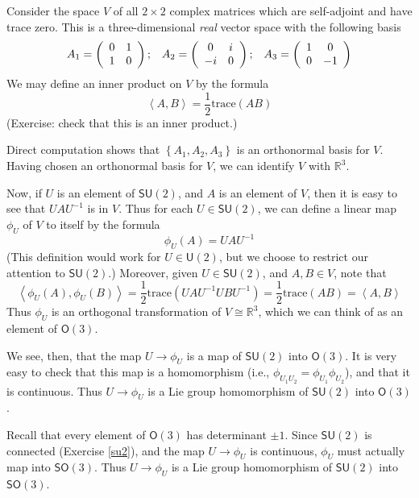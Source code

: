 \documentclass[12pt]{amsbook}
\theoremstyle{plain}
\numberwithin{equation}{chapter}
\numberwithin{theorem}{chapter}
\begin{document}
Consider the space $V$ of all $2\times2$ complex matrices which are
self-adjoint and have trace zero. This is a three-dimensional \textit{real}
vector space with the following basis
\[%
\begin{array}
[c]{ccc}%
A_{1}=\left(
\begin{array}
[c]{cc}%
0 & 1\\
1 & 0
\end{array}
\right)  ; & A_{2}=\left(
\begin{array}
[c]{cc}%
0 & i\\
-i & 0
\end{array}
\right)  ; & A_{3}=\left(
\begin{array}
[c]{cc}%
1 & 0\\
0 & -1
\end{array}
\right)
\end{array}
\]
We may define an inner product on $V$ by the formula
\[
\left\langle A,B\right\rangle =\frac12\mathrm{trace}(AB)
\]
(Exercise: check that this is an inner product.)

Direct computation shows that $\left\{  A_{1},A_{2},A_{3}\right\}  $ is an
orthonormal basis for $V$. Having chosen an orthonormal basis for $V$, we can
identify $V$ with $\mathbb{R}^{3}$.

Now, if $U$ is an element of $\mathsf{SU}(2)$, and $A$ is an element of $V$,
then it is easy to see that $UAU^{-1}$ is in $V$. Thus for each $U\in
\mathsf{SU}(2)$, we can define a linear map $\phi_{U}$ of $V$ to itself by the
formula
\[
\phi_{U}(A)=UAU^{-1}%
\]
(This definition would work for $U\in\mathsf{U}(2)$, but we choose to restrict
our attention to $\mathsf{SU}(2)$.) Moreover, given $U\in\mathsf{SU}(2)$, and
$A,B\in V$, note that
\[
\left\langle \phi_{U}(A),\phi_{U}(B)\right\rangle =\frac12\mathrm{trace}%
(UAU^{-1}UBU^{-1})=\frac12\mathrm{trace}(AB)=\left\langle A,B\right\rangle
\]
Thus $\phi_{U}$ is an orthogonal transformation of $V\cong\mathbb{R}^{3}$,
which we can think of as an element of $\mathsf{O}(3)$.

We see, then, that the map $U\rightarrow\phi_{U}$ is a map of $\mathsf{SU}(2)
$ into $\mathsf{O}(3)$. It is very easy to check that this map is a
homomorphism (i.e., $\phi_{U_{1}U_{2}}=\phi_{U_{1}}\phi_{U_{2}}$), and that it
is continuous. Thus $U\rightarrow\phi_{U}$ is a Lie group homomorphism of
$\mathsf{SU}(2)$ into $\mathsf{O}(3)$.

Recall that every element of $\mathsf{O}(3)$ has determinant $\pm1$. Since
$\mathsf{SU}(2)$ is connected (Exercise \ref{su2}), and the map $U\rightarrow
\phi_{U}$ is continuous, $\phi_{U}$ must actually map into $\mathsf{SO}(3)$.
Thus $U\rightarrow\phi_{U}$ is a Lie group homomorphism of $\mathsf{SU}(2)$
into $\mathsf{SO}(3)$.
\end{document}
